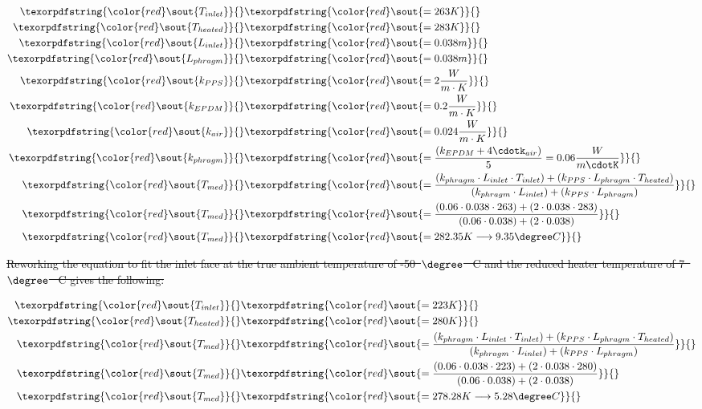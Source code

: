 \documentclass[a4paper,12pt,twoside, final]{article}
\providecommand{\DIFdeltex}[1]{{\protect\color{red}\sout{#1}}}                      %
\providecommand{\DIFdel}[1]{\texorpdfstring{\DIFdeltex{#1}}{}} %
\begin{document}
\begin{align*}
    \DIFdel{T_{inlet} }&\DIFdel{= 263 K}\\
    \DIFdel{T_{heated} }&\DIFdel{= 283 K}\\
    \DIFdel{L_{inlet} }&\DIFdel{= 0.038 m}\\
    \DIFdel{L_{phragm} }&\DIFdel{= 0.038 m}\\
    \DIFdel{k_{PPS} }&\DIFdel{= 2\frac{W}{m\cdot K}}\\
    \DIFdel{k_{EPDM} }&\DIFdel{= 0.2\frac{W}{m\cdot K}}\\
    \DIFdel{k_{air} }&\DIFdel{= 0.024\frac{W}{m\cdot K}}\\
    \DIFdel{k_{phragm} }&\DIFdel{=  \frac{(k_{EPDM}+4\cdotk_{air})}{5} = 0.06\frac{W}{m\cdotK}}\\
    \DIFdel{T_{med} }&\DIFdel{= \frac{( k_{phragm}\cdot   L_{inlet}\cdot T_{inlet}) + (k_{PPS}\cdot L_{phragm}\cdot T_{heated}) }{ (k_{phragm}\cdot L_{inlet}) + (k_{PPS} \cdot L_{phragm})} }\\
    \DIFdel{T_{med} }&\DIFdel{= \frac{ (0.06\cdot  0.038\cdot 263) + (2\cdot 0.038\cdot 283)}{(0.06\cdot 0.038) + (2\cdot 0.038)} }\\
    \DIFdel{T_{med} }&\DIFdel{= 282.35 K \longrightarrow 9.35\degree C
 }\end{align*}

\DIFdel{Reworking the equation to fit the inlet face at the true ambient temperature of -50\mbox{%
$\degree$
}%
C and the reduced heater temperature of 7\mbox{%
$\degree$
}%
C gives the following:
}%


\begin{align*}
     \DIFdel{T_{inlet} }&\DIFdel{= 223 K}\\
    \DIFdel{T_{heated} }&\DIFdel{= 280 K}\\
    \DIFdel{T_{med} }&\DIFdel{= \frac{ (k_{phragm}\cdot L_{inlet}\cdot T_{inlet}) + (k_{PPS}\cdot L_{phragm}\cdot T_{heated}) }{ (k_{phragm}\cdot L_{inlet}) + (k_{PPS}\cdot L_{phragm})}}\\
    \DIFdel{T_{med} }&\DIFdel{= \frac{ (0.06\cdot 0.038\cdot 223) + (2\cdot 0.038\cdot 280)}{(0.06\cdot 0.038) + (2\cdot 0.038)}}\\
    \DIFdel{T_{med} }&\DIFdel{= 278.28 K \longrightarrow 5.28\degree C
 }\end{align*}
\end{document}
